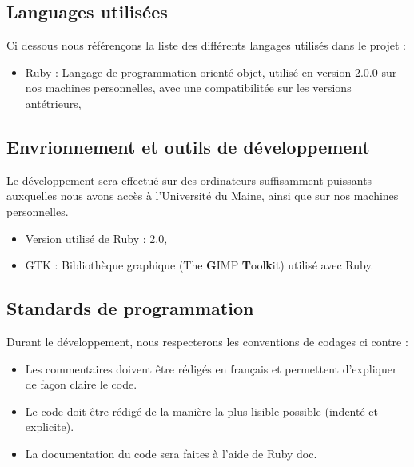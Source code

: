 \documentclass[11pt]{article}
\begin{document}
\subsection{Languages utilisées}

Ci dessous nous référençons la liste des différents langages utilisés dans le projet : 

\begin{itemize}
	\item Ruby : Langage de programmation orienté objet, utilisé en version 2.0.0 sur nos machines personnelles, avec une compatibilitée sur les versions antétrieurs,
\end{itemize}

\subsection{Envrionnement et outils de développement}

Le développement sera effectué sur des ordinateurs suffisamment puissants auxquelles nous avons accès à l'Université du Maine, ainsi que sur nos machines personnelles.

\begin{itemize}
		\item Version utilisé de Ruby : 2.0,
		\item GTK : Bibliothèque graphique (The \textbf{G}IMP \textbf{T}ool\textbf{k}it) utilisé avec Ruby.
\end{itemize}

\subsection{Standards de programmation}

Durant le développement, nous respecterons les conventions de codages ci contre : 

\begin{itemize}
	\item Les commentaires doivent être rédigés en français et permettent d'expliquer de façon claire le code.
    \item Le code doit être rédigé de la manière la plus lisible possible (indenté et explicite).
	\item La documentation du code sera faites à l'aide de Ruby doc.
\end{itemize}
\end{document}
